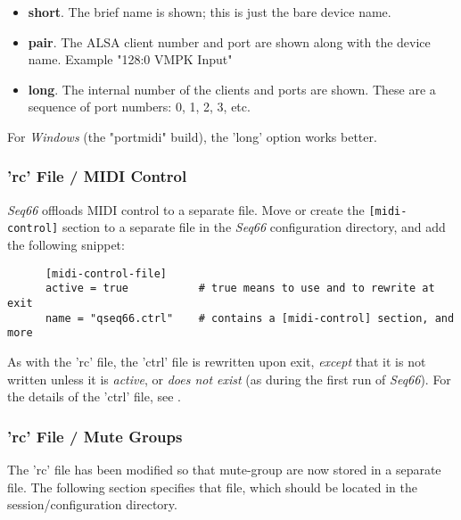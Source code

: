    \begin{itemize}
      \item \textbf{short}.
         The brief name is shown; this is just the bare device name.
      \item \textbf{pair}.
         The ALSA client number and port are shown along with the device name.
         Example "128:0 VMPK Input"
      \item \textbf{long}.
         The internal number of the clients and ports are shown.
         These are a sequence of port numbers: 0, 1, 2, 3, etc.
   \end{itemize}

   For \textsl{Windows} (the "portmidi" build),
   the 'long' option works better.

\subsubsection{'rc' File / MIDI Control}
\label{subsubsec:configuration_rc_midi_control}

   \textsl{Seq66} offloads MIDI control to a separate file.
   Move or create
   the \texttt{[midi-control]} section to a separate file in
   the \textsl{Seq66} configuration directory, and add the following
   snippet:

   \begin{verbatim}
      [midi-control-file]
      active = true           # true means to use and to rewrite at exit
      name = "qseq66.ctrl"    # contains a [midi-control] section, and more
   \end{verbatim}

   As with the 'rc' file, the 'ctrl' file is rewritten upon exit,
   \textsl{except} that it is not written unless it is \textsl{active},
   or \textsl{does not exist} (as during the first run of \textsl{Seq66}).
   For the details of the 'ctrl' file, see
   .

\subsubsection{'rc' File / Mute Groups}
\label{subsubsec:configuration_rc_mute_groups}

   The 'rc' file has been modified so that mute-group are now stored in a
   separate file.  The following section specifies that file, which should be
   located in the session/configuration directory.

